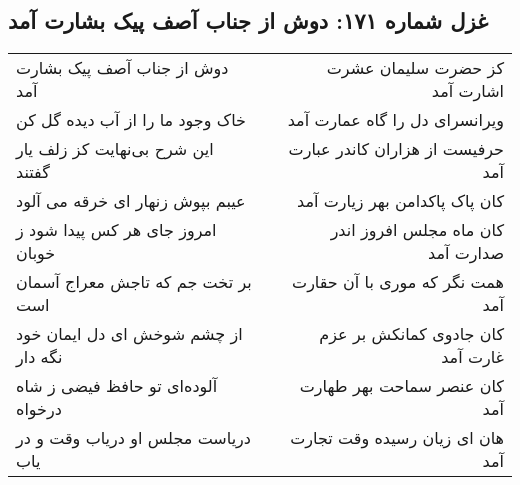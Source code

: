 \begin{center}
\section*{غزل شماره ۱۷۱: دوش از جناب آصف پیک بشارت آمد}
\label{sec:sh171}
\begin{longtable}{l p{0.5cm} r}
دوش از جناب آصف پیک بشارت آمد
&&
کز حضرت سلیمان عشرت اشارت آمد
\\
خاک وجود ما را از آب دیده گل کن
&&
ویرانسرای دل را گاه عمارت آمد
\\
این شرح بی‌نهایت کز زلف یار گفتند
&&
حرفیست از هزاران کاندر عبارت آمد
\\
عیبم بپوش زنهار ای خرقه می آلود
&&
کان پاک پاکدامن بهر زیارت آمد
\\
امروز جای هر کس پیدا شود ز خوبان
&&
کان ماه مجلس افروز اندر صدارت آمد
\\
بر تخت جم که تاجش معراج آسمان است
&&
همت نگر که موری با آن حقارت آمد
\\
از چشم شوخش ای دل ایمان خود نگه دار
&&
کان جادوی کمانکش بر عزم غارت آمد
\\
آلوده‌ای تو حافظ فیضی ز شاه درخواه
&&
کان عنصر سماحت بهر طهارت آمد
\\
دریاست مجلس او دریاب وقت و در یاب
&&
هان ای زیان رسیده وقت تجارت آمد
\\
\end{longtable}
\end{center}
